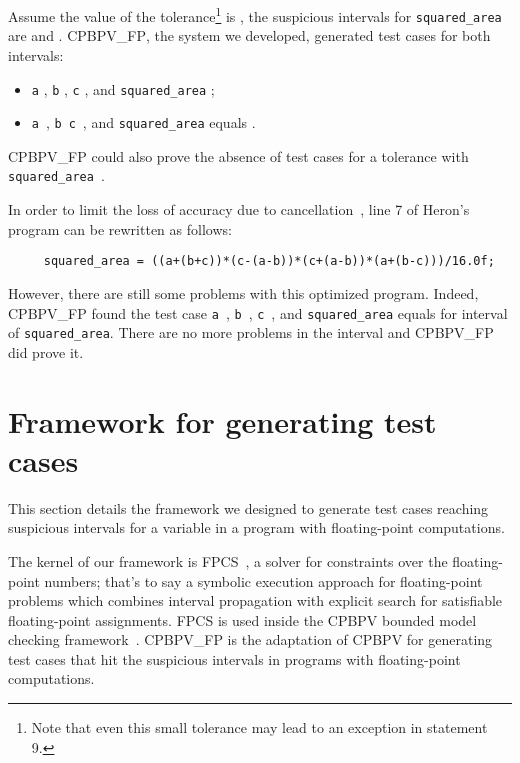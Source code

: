 \documentclass[a4paper]{llncs}
\newcommand{\olivier}[2]{\ifempty{#1}{\textcolor{black}{#2}}{(\sout{#1}) \textcolor{red}{#2}}}
\newcommand{\FPCS}{\textsc{FPCS}}
\newcommand{\CPBPV}{\textsc{CPBPV}}
\newcommand{\OUR}{\textsc{CPBPV\_FP}}
\begin{document}
Assume the value of the tolerance\footnote{Note that even this small
  tolerance may lead to an exception in statement 9.}  
is , the suspicious intervals for \lstinline|squared_area|
are  and
. \OUR{}, the system we developed,
generated test cases for both intervals:
\begin{itemize}
\vspace{-0.4cm}
\item \lstinline|a| , \lstinline|b| ,
  \lstinline|c| , and \lstinline|squared_area|
  \olivier{}{equals} ;

\item \mbox{\lstinline|a| }, \mbox{\lstinline|b| 
  \lstinline|c| }, and  \lstinline|squared_area| equals .
\end{itemize}


 \OUR{} could also  prove the absence of test cases for a  tolerance  with 
\mbox{\lstinline|squared_area| }.

In order to limit the loss of accuracy due to
cancellation~\cite{goldberg91}, line 7 of Heron's program can be rewritten as follows:
\vspace{-0.2cm}\begin{small}
\begin{verbatim}
     squared_area = ((a+(b+c))*(c-(a-b))*(c+(a-b))*(a+(b-c)))/16.0f;
\end{verbatim}
\end{small}


\vspace{-0.2cm} 
\noindent However, there are still some problems with this optimized program. Indeed,  \OUR{} found  the test case  \mbox{\lstinline|a| },
  \mbox{\lstinline|b| }, \mbox{\lstinline|c| },
  and \lstinline|squared_area| equals  for   interval   of \lstinline|squared_area|. 
There are no more problems in the interval  and  \OUR{} did prove it.



\section{Framework for generating test cases}
\label{sec:approach}


This section details the framework we designed to generate test cases
reaching suspicious intervals for a variable  in a program  with
floating-point computations.  

The kernel of our framework is \FPCS{}~\cite{michelRueherLebbah01,michel02,botellaGotliebMichel06,marreMichel10}, a solver for constraints over the floating-point numbers; that's to say  a symbolic execution approach for floating-point problems which combines interval propagation with explicit search for satisfiable floating-point assignments. \FPCS{} is used inside the \CPBPV{}
bounded model checking framework~\cite{collavizzaRueherVanHentenryck10}. \OUR{} is the adaptation of \CPBPV{} for generating test cases that hit the
suspicious intervals in programs with floating-point computations.
\end{document}
